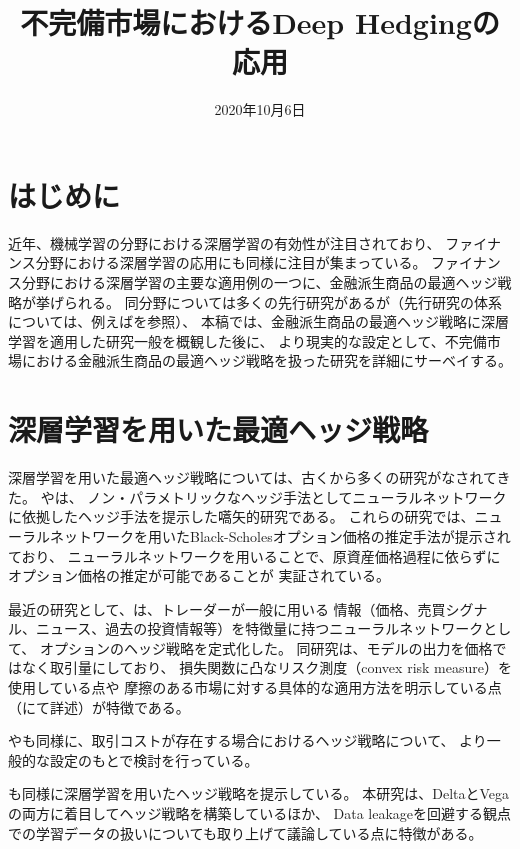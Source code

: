 \documentclass[autodetect-engine, dvipdfmx-if-dvi, ja=standard]{ltjsarticle}
\title{不完備市場におけるDeep Hedgingの応用}
\date{2020年10月6日}
\begin{document}
\maketitle

\section{はじめに}
近年、機械学習の分野における深層学習の有効性が注目されており、
ファイナンス分野における深層学習の応用にも同様に注目が集まっている。
ファイナンス分野における深層学習の主要な適用例の一つに、金融派生商品の最適ヘッジ戦略が挙げられる。
同分野については多くの先行研究があるが（先行研究の体系については、例えば\cite{ruf2020neural}を参照）、
本稿では、金融派生商品の最適ヘッジ戦略に深層学習を適用した研究一般を概観した後に、
より現実的な設定として、不完備市場における金融派生商品の最適ヘッジ戦略を扱った研究を詳細にサーベイする。


\section{深層学習を用いた最適ヘッジ戦略}
深層学習を用いた最適ヘッジ戦略については、古くから多くの研究がなされてきた。
\cite{malliaris1993neural}や\cite{hutchinson1994nonparametric}は、
ノン・パラメトリックなヘッジ手法としてニューラルネットワークに依拠したヘッジ手法を提示した嚆矢的研究である。
これらの研究では、ニューラルネットワークを用いたBlack-Scholesオプション価格の推定手法が提示されており、
ニューラルネットワークを用いることで、原資産価格過程に依らずにオプション価格の推定が可能であることが
実証されている。

最近の研究として、\cite{buehler2019deepA,buehler2019deepB}は、トレーダーが一般に用いる
情報（価格、売買シグナル、ニュース、過去の投資情報等）を特徴量に持つニューラルネットワークとして、
オプションのヘッジ戦略を定式化した。
同研究は、モデルの出力を価格ではなく取引量にしており、
損失関数に凸なリスク測度（convex risk measure）を使用している点や
摩擦のある市場に対する具体的な適用方法を明示している点（\cite{buehler2019deepB}にて詳述）が特徴である。

\cite{kolm2019dynamic}や\cite{du2020deep}も同様に、取引コストが存在する場合におけるヘッジ戦略について、
より一般的な設定のもとで検討を行っている。

\cite{ruf2020hedging}も同様に深層学習を用いたヘッジ戦略を提示している。
本研究は、DeltaとVegaの両方に着目してヘッジ戦略を構築しているほか、
Data leakageを回避する観点での学習データの扱いについても取り上げて議論している点に特徴がある。
\end{document}
